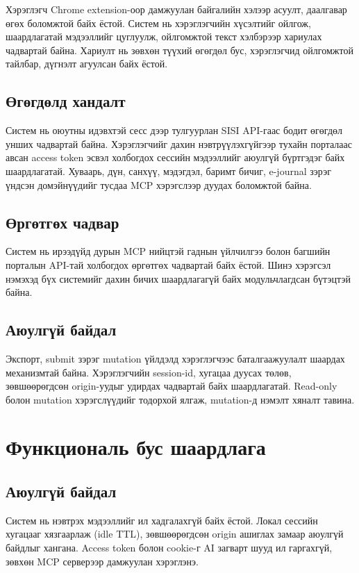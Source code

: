 Хэрэглэгч Chrome extension-оор дамжуулан байгалийн хэлээр асуулт, даалгавар өгөх боломжтой байх ёстой. Систем нь хэрэглэгчийн хүсэлтийг ойлгож, шаардлагатай мэдээллийг цуглуулж, ойлгомжтой текст хэлбэрээр хариулах чадвартай байна. Хариулт нь зөвхөн түүхий өгөгдөл бус, хэрэглэгчид ойлгомжтой тайлбар, дүгнэлт агуулсан байх ёстой.

\subsection{Өгөгдөлд хандалт}

Систем нь оюутны идэвхтэй сесс дээр тулгуурлан SISI API-гаас бодит өгөгдөл унших чадвартай байна. Хэрэглэгчийг дахин нэвтрүүлэхгүйгээр тухайн порталаас авсан access token эсвэл холбогдох сессийн мэдээллийг аюулгүй бүртгэдэг байх шаардлагатай. Хуваарь, дүн, санхүү, мэдэгдэл, баримт бичиг, e-journal зэрэг үндсэн домэйнүүдийг тусдаа MCP хэрэгслээр дуудах боломжтой байна.

\subsection{Өргөтгөх чадвар}

Систем нь ирээдүйд дурын MCP нийцтэй гаднын үйлчилгээ болон багшийн порталын API-тай холбогдох өргөтгөх чадвартай байх ёстой. Шинэ хэрэгсэл нэмэхэд бүх системийг дахин бичих шаардлагагүй байх модульчлагдсан бүтэцтэй байна.

\subsection{Аюулгүй байдал}

Экспорт, submit зэрэг mutation үйлдэлд хэрэглэгчээс баталгаажуулалт шаардах механизмтай байна. Хэрэглэгчийн session-id, хугацаа дуусах төлөв, зөвшөөрөгдсөн origin-уудыг удирдах чадвартай байх шаардлагатай. Read-only болон mutation хэрэгслүүдийг тодорхой ялгаж, mutation-д нэмэлт хяналт тавина.

\section{Функциональ бус шаардлага}

\subsection{Аюулгүй байдал}

Систем нь нэвтрэх мэдээллийг ил хадгалахгүй байх ёстой. Локал сессийн хугацааг хязгаарлаж (idle TTL), зөвшөөрөгдсөн origin ашиглах замаар аюулгүй байдлыг хангана. Access token болон cookie-г AI загварт шууд ил гаргахгүй, зөвхөн MCP серверээр дамжуулан хэрэглэнэ.

